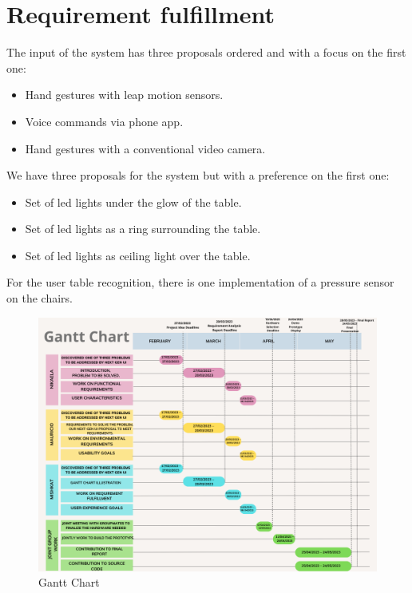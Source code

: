 \documentclass{article}
\begin{document}
\section{Requirement fulfillment}
The input of the system has three proposals ordered and with a focus on the first one:
\begin{itemize}
    \item Hand gestures with leap motion sensors.
    \item Voice commands via phone app.
    \item Hand gestures with a conventional video camera.
\end{itemize}
We have three proposals for the system but with a preference on the first one:
\begin{itemize}
    \item Set of led lights under the glow of the table.
    \item Set of led lights as a ring surrounding the table.
    \item Set of led lights as ceiling light over the table.
\end{itemize}
For the user table recognition, there is one implementation of a pressure sensor on the chairs.


\begin{figure}[!htb]
\centering
\includegraphics[width=\linewidth]{GanttChart.png}
\caption{Gantt Chart}
\label{}
\end{figure}



\end{document}
